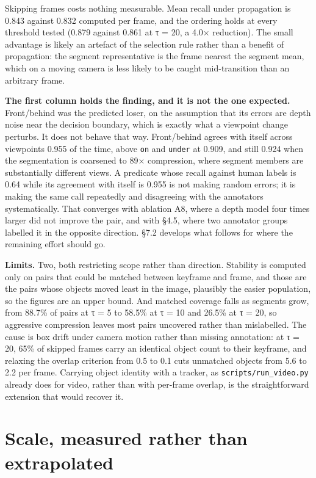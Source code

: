 Skipping frames costs nothing measurable. Mean recall under propagation is 0.843 against 0.832 computed per frame, and the ordering holds at every threshold tested (0.879 against 0.861 at τ = 20, a 4.0$\times$ reduction). The small advantage is likely an artefact of the selection rule rather than a benefit of propagation: the segment representative is the frame nearest the segment mean, which on a moving camera is less likely to be caught mid-transition than an arbitrary frame.

\textbf{The first column holds the finding, and it is not the one expected.} Front/behind was the predicted loser, on the assumption that its errors are depth noise near the decision boundary, which is exactly what a viewpoint change perturbs. It does not behave that way. Front/behind agrees with itself across viewpoints 0.955 of the time, above \texttt{on} and \texttt{under} at 0.909, and still 0.924 when the segmentation is coarsened to 89$\times$ compression, where segment members are substantially different views. A predicate whose recall against human labels is 0.64 while its agreement with itself is 0.955 is not making random errors; it is making the same call repeatedly and disagreeing with the annotators systematically. That converges with ablation A8, where a depth model four times larger did not improve the pair, and with \S4.5, where two annotator groups labelled it in the opposite direction. \S7.2 develops what follows for where the remaining effort should go.

\textbf{Limits.} Two, both restricting scope rather than direction. Stability is computed only on pairs that could be matched between keyframe and frame, and those are the pairs whose objects moved least in the image, plausibly the easier population, so the figures are an upper bound. And matched coverage falls as segments grow, from 88.7\% of pairs at τ = 5 to 58.5\% at τ = 10 and 26.5\% at τ = 20, so aggressive compression leaves most pairs uncovered rather than mislabelled. The cause is box drift under camera motion rather than missing annotation: at τ = 20, 65\% of skipped frames carry an identical object count to their keyframe, and relaxing the overlap criterion from 0.5 to 0.1 cuts unmatched objects from 5.6 to 2.2 per frame. Carrying object identity with a tracker, as \texttt{scripts/run\_video.py} already does for video, rather than with per-frame overlap, is the straightforward extension that would recover it.

\section{Scale, measured rather than extrapolated}

